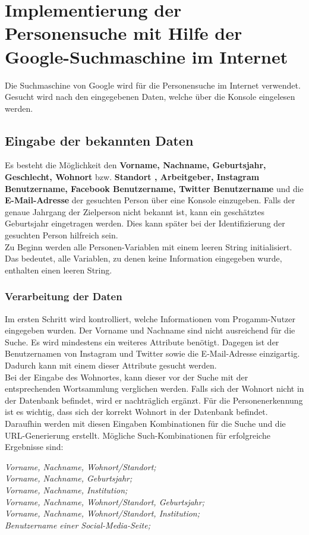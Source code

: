 \section{Implementierung der Personensuche mit Hilfe der Google-Suchmaschine im Internet}
Die Suchmaschine von Google wird für die Personensuche im Internet verwendet. Gesucht wird nach den eingegebenen Daten, welche über die Konsole eingelesen werden.

	\subsection{Eingabe der bekannten Daten}
	Es besteht die Möglichkeit den \textbf{Vorname, Nachname, Geburtsjahr, Geschlecht, Wohnort} bzw. \textbf{Standort , Arbeitgeber, Instagram Benutzername, Facebook Benutzername, Twitter Benutzername} und die \textbf{E-Mail-Adresse} der gesuchten Person über eine Konsole einzugeben. Falls der genaue Jahrgang der Zielperson nicht bekannt ist, kann ein geschätztes Geburtsjahr eingetragen werden. Dies kann später bei der Identifizierung der gesuchten Person hilfreich sein.\\
	Zu Beginn werden alle Personen-Variablen mit einem leeren String initialisiert. Das bedeutet, alle Variablen, zu denen keine Information eingegeben wurde, enthalten einen leeren String.
	
		\subsubsection{Verarbeitung der Daten}
		Im ersten Schritt wird kontrolliert, welche Informationen vom Progamm-Nutzer eingegeben wurden. Der Vorname und Nachname sind nicht ausreichend für die Suche. Es wird mindestens ein weiteres Attribute benötigt. Dagegen ist der Benutzernamen von Instagram und Twitter sowie die E-Mail-Adresse einzigartig. Dadurch kann mit einem dieser Attribute gesucht werden.\\
		Bei der Eingabe des Wohnortes, kann dieser vor der Suche mit der entsprechenden Wortsammlung verglichen werden. Falls sich der Wohnort nicht in der Datenbank befindet, wird er nachträglich ergänzt. Für die Personenerkennung ist es wichtig, dass sich der korrekt Wohnort in der Datenbank befindet.\\
		Daraufhin werden mit diesen Eingaben Kombinationen für die Suche und die URL-Generierung erstellt. Mögliche Such-Kombinationen für erfolgreiche Ergebnisse sind:
		
		\textit{Vorname, Nachname, Wohnort/Standort;}\\
		\textit{Vorname, Nachname, Geburtsjahr;}\\
		\textit{Vorname, Nachname, Institution;}\\
		\textit{Vorname, Nachname, Wohnort/Standort, Geburtsjahr;}\\
		\textit{Vorname, Nachname, Wohnort/Standort, Institution;}\\
		\textit{Benutzername einer Social-Media-Seite;}
		

